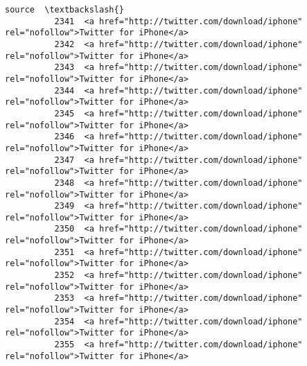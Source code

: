 \documentclass[11pt]{article}
\begin{document}
\begin{Verbatim}[commandchars=\\\{\}]
                                                                                            source  \textbackslash{}
          2341  <a href="http://twitter.com/download/iphone" rel="nofollow">Twitter for iPhone</a>   
          2342  <a href="http://twitter.com/download/iphone" rel="nofollow">Twitter for iPhone</a>   
          2343  <a href="http://twitter.com/download/iphone" rel="nofollow">Twitter for iPhone</a>   
          2344  <a href="http://twitter.com/download/iphone" rel="nofollow">Twitter for iPhone</a>   
          2345  <a href="http://twitter.com/download/iphone" rel="nofollow">Twitter for iPhone</a>   
          2346  <a href="http://twitter.com/download/iphone" rel="nofollow">Twitter for iPhone</a>   
          2347  <a href="http://twitter.com/download/iphone" rel="nofollow">Twitter for iPhone</a>   
          2348  <a href="http://twitter.com/download/iphone" rel="nofollow">Twitter for iPhone</a>   
          2349  <a href="http://twitter.com/download/iphone" rel="nofollow">Twitter for iPhone</a>   
          2350  <a href="http://twitter.com/download/iphone" rel="nofollow">Twitter for iPhone</a>   
          2351  <a href="http://twitter.com/download/iphone" rel="nofollow">Twitter for iPhone</a>   
          2352  <a href="http://twitter.com/download/iphone" rel="nofollow">Twitter for iPhone</a>   
          2353  <a href="http://twitter.com/download/iphone" rel="nofollow">Twitter for iPhone</a>   
          2354  <a href="http://twitter.com/download/iphone" rel="nofollow">Twitter for iPhone</a>   
          2355  <a href="http://twitter.com/download/iphone" rel="nofollow">Twitter for iPhone</a>   
          

\end{Verbatim}
\end{document}
